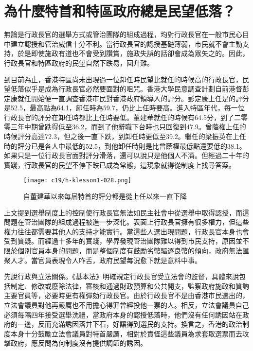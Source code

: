 \section{為什麼特首和特區政府總是民望低落？}

無論是行政長官的選舉方式或管治團隊的組成過程，均對行政長官在一般市民心目中建立認授和管治威信十分不利。當行政長官的認授基礎薄弱，市民就不會主動支持，於是即使施政有道也不會受到讚賞，施政失誤的話卻會成為眾矢之的。因此，行政長官和特區政府的民望自然下跌易，回升難。

到目前為止，香港特區尚未出現過一位卸任時民望比就任的時候高的行政長官，民望低落似乎是成為行政長官必然要面對的咀咒。香港大學民意調查計劃自前港督彭定康就任開始便一直調查香港市民對香港政府領導人的評分。彭定康上任是的評分是52.5，最高點為64.1，卸任時為59.7，仍比上任時要高。進入特區年代，每一位行政長官的評分在卸任時都比上任時要低。董建華就任的時候有64.5分，到了二零零三年中期曾跌得低至36.2，而到了他辭職下台時也只回復到47.9。曾蔭權上任的時候評分高達72.3，但之後一直下跌，到卸任時更低至39.2。繼任的梁振英在上任時的評分已是各人中最低的52.5，到他卸任時則是比曾蔭權最低點還要低的38.1。如果只是一位行政長官面對評分滑落，還可以說只是他個人不濟。但經過二十年的實踐，行政長官的民望不停下跌已成為常態，這現象就得從制度上找尋答案。

\begin{figure}[htbp]
    \centering
    \texttt{[image: c19/h-klesson1-028.png]}
    \caption{自董建華以來每屆特首的評分都是從上任以來一直下降} 
\end{figure}

上文提到選舉制度上的控制使行政長官無法如民主社會中從選舉中取得認授，而這問題在管治團隊的組成過程被進一步深化。表面上行政長官擁有很多權力，但這些權力往往都需要其他人的支持才能實行。當這些人選出現問題，行政長官本身也會受到質疑。而經過十多年的實踐，學界發現管治團隊難以得到市民支持，原因並不限於個別官員本身的問題，而是整個制度有鼓勵劣幣驅逐良幣的傾向，政府無法匯聚人才。當官員表現令人咋舌，政府民望每況愈下就是意料中事。

先說行政與立法關係。《基本法》明確規定行政長官受立法會的監督，具體來說包括制定、修改或廢除法律，審核和通過財政預算和公共開支，監察政府施政和質詢主要官員等，必要時更有權彈劾行政長官。由於行政長官不是由香港市民選出的，立法會議員對他再嚴厲也不用擔心得罪曾經投他一票的人。相反，立法會議員自己必須每隔四年接受選舉洗禮，當政府本身的認授低落時，他們沒有任何誘因站在政府的一邊，反而充滿誘因落井下石，好讓得到選民的支持。換言之，香港的政治制度本身十分鼓勵立法會議員對特首嚴厲，相對於責怪這些議員為求套取選票而去攻擊政府，應反問為何制度沒有提供調節的誘因。

